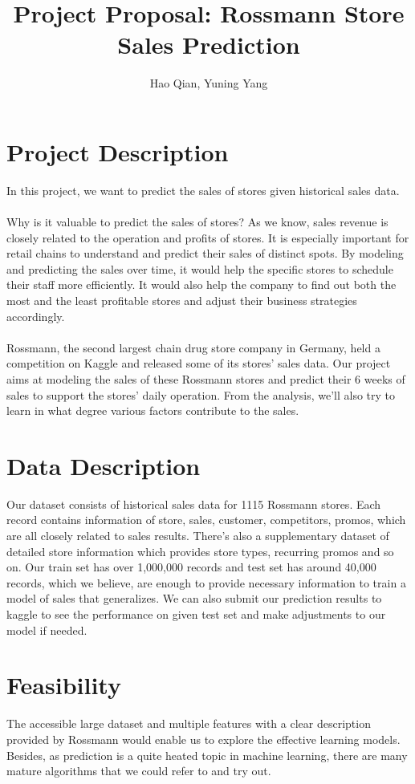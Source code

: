 \documentclass[11pt]{article}
\title{Project Proposal: Rossmann Store Sales Prediction}
\author{Hao Qian, Yuning Yang}
\begin{document}
\maketitle
\section{Project Description}
In this project, we want to predict the sales of stores given historical sales data.\\\\
Why is it valuable to predict the sales of stores? As we know, sales revenue is closely related to the operation and profits of stores. It is especially important for retail chains to understand and predict their sales of distinct spots. By modeling and predicting the sales over time, it would help the specific stores to schedule their staff more efficiently. It would also help the company to find out both the most and the least profitable stores and adjust their business strategies accordingly. \\\\
Rossmann, the second largest chain drug store company in Germany, held a competition on Kaggle and released some of its stores' sales data. Our project aims at modeling the sales of these Rossmann stores and predict their 6 weeks of sales to support the stores’ daily operation. From the analysis, we'll also try to learn in what degree various factors contribute to the sales. 

\section{Data Description}
Our dataset consists of historical sales data for 1115 Rossmann stores. Each record contains information of store, sales, customer, competitors, promos, which are all closely related to sales results. There's also a supplementary dataset of detailed store information which provides store types, recurring promos and so on. Our train set has over 1,000,000 records and test set has around 40,000 records, which we believe, are enough to provide necessary information to train a model of sales that generalizes. We can also submit our prediction results to kaggle to see the performance on given test set and make adjustments to our model if needed.
\section{Feasibility}
The accessible large dataset and multiple features with a clear description provided by Rossmann would enable us to explore the effective learning models. Besides, as prediction is a quite heated topic in machine learning, there are many mature algorithms that we could refer to and try out.
\end{document}
